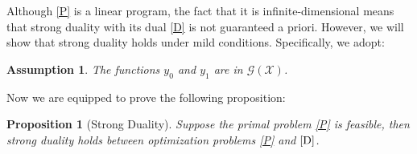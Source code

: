 \documentclass[12pt,a4paper]{article}
\newtheorem{assumption}{Assumption}[section]
\newtheorem{proposition}{Proposition}
\begin{document}
Although \eqref{P} is a linear program, the fact that it is infinite-dimensional means that strong duality with its dual \eqref{D} is not guaranteed a priori. However, we will show that strong duality holds under mild conditions. Specifically, we adopt:


\begin{assumption} \label{assumption:dualpair}
 The functions $y_0$ and $y_1$ are in $\mathcal{G}(\mathcal{X})$.
\end{assumption}

Now we are equipped to prove the following proposition:


	\begin{proposition}[Strong Duality] \label{prop:strong_duality}
		Suppose the primal problem \eqref{P} is feasible, 
		then strong duality holds between optimization problems \eqref{P} and $\eqref{D}$.
	\end{proposition}
	
\end{document}
